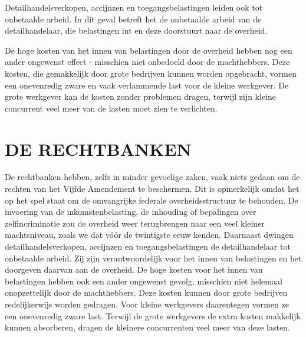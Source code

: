 \documentclass[
  a5paper,
  smalldemyvopaper,10pt,twoside,onecolumn,openright,extrafontsizes,hidelinks]{memoir}
\begin{document}
Detailhandelsverkopen, accijnzen en toegangsbelastingen leiden ook tot
onbetaalde arbeid. In dit geval betreft het de onbetaalde arbeid van de
detailhandelaar, die belastingen int en deze doorstuurt naar de
overheid.

De hoge kosten van het innen van belastingen door de overheid hebben nog
een ander ongewenst effect - misschien niet onbedoeld door de
machthebbers. Deze kosten, die gemakkelijk door grote bedrijven kunnen
worden opgebracht, vormen een onevenredig zware en vaak verlammende last
voor de kleine werkgever. De grote werkgever kan de kosten zonder
problemen dragen, terwijl zijn kleine concurrent veel meer van de lasten
moet zien te verlichten.

\section{DE RECHTBANKEN}\label{de-rechtbanken}

De rechtbanken hebben, zelfs in minder gevoelige zaken, vaak niets
gedaan om de rechten van het Vijfde Amendement te beschermen. Dit is
opmerkelijk omdat het op het spel staat om de omvangrijke federale
overheidsstructuur te behouden. De invoering van de inkomstenbelasting,
de inhouding of bepalingen over zelfincriminatie zou de overheid weer
terugbrengen naar een veel kleiner machtsniveau, zoals we dat vóór de
twintigste eeuw kenden. Daarnaast dwingen detailhandelsverkopen,
accijnzen en toegangsbelastingen de detailhandelaar tot onbetaalde
arbeid. Zij zijn verantwoordelijk voor het innen van belastingen en het
doorgeven daarvan aan de overheid. De hoge kosten voor het innen van
belastingen hebben ook een ander ongewenst gevolg, misschien niet
helemaal onopzettelijk door de machthebbers. Deze kosten kunnen door
grote bedrijven redelijkerwijs worden gedragen. Voor kleine werkgevers
daarentegen vormen ze een onevenredig zware last. Terwijl de grote
werkgevers de extra kosten makkelijk kunnen absorberen, dragen de
kleinere concurrenten veel meer van deze lasten.
\end{document}

